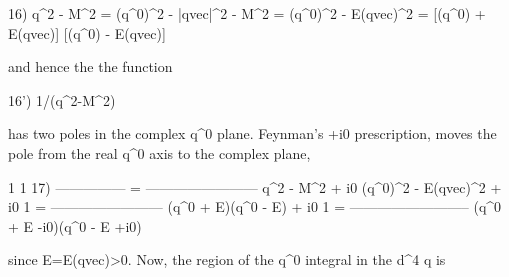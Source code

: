 \documentclass[12pt]{article}
\begin{document}
  16) q^2 - M^2 = (q^0)^2 - |qvec|^2 - M^2
                = (q^0)^2 - E(qvec)^2
                = [(q^0) + E(qvec)] [(q^0) - E(qvec)]

  and hence the the function

  16') 1/(q^2-M^2)

  has two poles in the complex q^0 plane.  Feynman's +i0 prescription,
  moves the pole from the real q^0 axis to the complex plane,

            1                     1
  17) --------------- = ------------------------
      q^2 - M^2 + i0    (q^0)^2 - E(qvec)^2 + i0
                                  1
                      = ------------------------
                        (q^0 + E)(q^0 - E) + i0
                                  1
                      = --------------------------
                        (q^0 + E -i0)(q^0 - E +i0)

  since E=E(qvec)>0.  Now, the region of the q^0 integral in the d^4 q is
\end{document}
